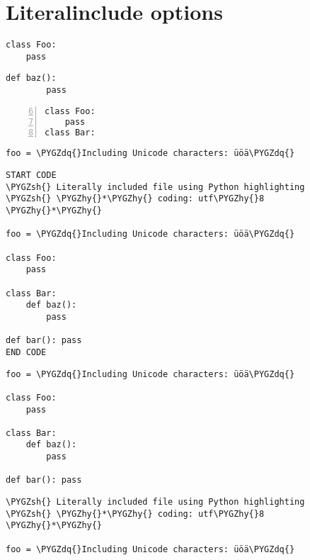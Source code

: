 \documentclass[letterpaper,10pt,english]{sphinxhowto}
\def\PYGZsh{\char`\#}
\def\PYGZhy{\char`\-}
\def\PYGZdq{\char`\"}
\begin{document}
\section{Literalinclude options}
\label{includes:literalinclude-options}
\begin{Verbatim}[commandchars=\\\{\}]
class Foo:
    pass
\end{Verbatim}

\begin{Verbatim}[commandchars=\\\{\}]
    def baz():
        pass
\end{Verbatim}

\begin{Verbatim}[commandchars=\\\{\},numbers=left,firstnumber=6,stepnumber=1]
class Foo:
    pass
class Bar:
\end{Verbatim}

\begin{Verbatim}[commandchars=\\\{\}]
foo = \PYGZdq{}Including Unicode characters: üöä\PYGZdq{}
\end{Verbatim}

\begin{Verbatim}[commandchars=\\\{\}]
START CODE
\PYGZsh{} Literally included file using Python highlighting
\PYGZsh{} \PYGZhy{}*\PYGZhy{} coding: utf\PYGZhy{}8 \PYGZhy{}*\PYGZhy{}

foo = \PYGZdq{}Including Unicode characters: üöä\PYGZdq{}

class Foo:
    pass

class Bar:
    def baz():
        pass

def bar(): pass
END CODE
\end{Verbatim}

\begin{Verbatim}[commandchars=\\\{\}]
foo = \PYGZdq{}Including Unicode characters: üöä\PYGZdq{}

class Foo:
    pass

class Bar:
    def baz():
        pass

def bar(): pass
\end{Verbatim}

\begin{Verbatim}[commandchars=\\\{\}]
\PYGZsh{} Literally included file using Python highlighting
\PYGZsh{} \PYGZhy{}*\PYGZhy{} coding: utf\PYGZhy{}8 \PYGZhy{}*\PYGZhy{}

foo = \PYGZdq{}Including Unicode characters: üöä\PYGZdq{}
\end{Verbatim}
\end{document}
